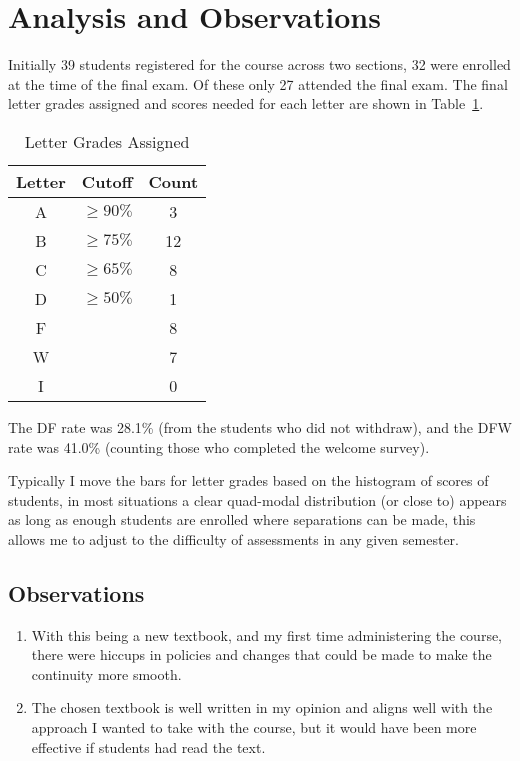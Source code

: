 \documentclass[11pt]{article}
\begin{document}
\section{Analysis and Observations}
\label{sec:analysis}
Initially 39 students registered for the course across two sections, 32 were enrolled at the time of the final exam. 
Of these only 27 attended the final exam. 
The final letter grades  assigned and scores needed for each letter are shown in Table~\ref{tab:letter}.\\
\begin{table}
\caption{Letter Grades Assigned}
\label{tab:letter}
\begin{center}
\begin{tabular}{|c|c|c|}
\hline
Letter & Cutoff & Count\\
\hline\hline
A	& $\ge90\%$ & 3\\
\hline
B	& $\ge75\% $& 12\\
\hline
C	& $\ge65\%$ & 8\\
\hline
D	& $\ge50\%$ & 1\\
\hline
F	&& 8\\
\hline
W 	&& 7\\
\hline
I	&& 0\\
\hline
\end{tabular}
\end{center}%
\end{table}


The DF rate was 28.1\% (from the students who did not withdraw), and the DFW rate was 41.0\% (counting those who completed the welcome survey). 

Typically I move the bars for letter grades based on the histogram of scores of students, in most situations a clear quad-modal distribution (or close to) appears as long as enough students are enrolled where separations can be made, this allows me to adjust to the difficulty of assessments in any given semester. 

\subsection{Observations}
\begin{enumerate}
\item With this being a new textbook, and my first time administering the course, there were hiccups in policies and changes that could be made to make the continuity more smooth. 
\item The chosen textbook is well written in my opinion and aligns well with the approach I wanted to take with the course, but it would have been more effective if students had read the text. 
\end{enumerate}
\end{document}
